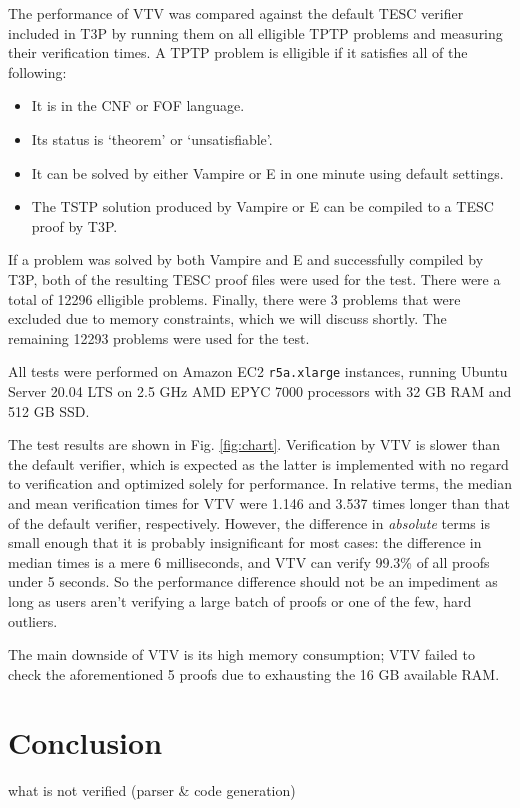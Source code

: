 \documentclass[12pt]{article}
\begin{document}
The performance of VTV was compared against the default TESC verifier 
included in T3P  by running them on all elligible TPTP problems and 
measuring their verification times. A TPTP problem is elligible if it 
satisfies all of the following:
\begin{itemize}
  \item It is in the CNF or FOF language. 
  \item Its status is `theorem' or `unsatisfiable'.
  \item It can be solved by either Vampire or E in one minute using default settings.
  \item The TSTP solution produced by Vampire or E can be compiled to a TESC proof by T3P.
\end{itemize}
If a problem was solved by both Vampire and E and successfully compiled 
by T3P, both of the resulting TESC proof files were used for the test.
There were a total of 12296 elligible problems. Finally, there were 3 
problems that were excluded due to memory constraints, which we will
discuss shortly. The remaining 12293 problems were used for the test.

All tests were performed on Amazon EC2 \texttt{r5a.xlarge} instances, running Ubuntu Server 20.04 LTS on 2.5 GHz AMD EPYC 7000 processors with 32 GB RAM and 512 GB SSD.

The test results are shown in Fig. \ref{fig:chart}. Verification by VTV is
slower than the default verifier, which is expected as the latter is implemented 
with no regard to verification and optimized solely for performance.
In relative terms, the median and mean verification times for VTV were 
1.146 and 3.537 times longer than that of the default verifier, respectively. 
However, the difference in \textit{absolute} terms is small enough that it is 
probably insignificant for most cases: the difference in median times is a
mere 6 milliseconds, and VTV can verify 99.3\% of all proofs under 5 seconds.
So the performance difference should not be an impediment as long as users 
aren't verifying a large batch of proofs or one of the few, hard outliers.

The main downside of VTV is its high memory consumption; VTV failed to check
the aforementioned 5 proofs due to exhausting the 16 GB available RAM.




\section{Conclusion}  \label{sec:conclusion}

what is not verified (parser \& code generation)





\end{document}
